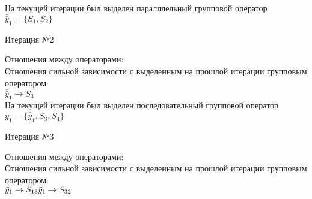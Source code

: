 \documentclass[a4paper,14pt]{article}
\begin{document}
%
На текущей итерации был выделен паралллельный групповой оператор $\bar{\bar{y}}_{1} = \{S_{1}, S_{2}\}$
\\
\begin{center} Итерация №2 \end{center}
Отношения между операторами: \\
Отношения сильной зависимости с выделенным на прошлой итерации групповым оператором: \\ \newline
\begin{math}
    \bar{\bar{y}}_{1} \rightarrow S_{3}
\end{math}\\ \newline
%
На текущей итерации был выделен последовательный групповой оператор $\bar{y}_{1} = \{\bar{\bar{y}}_{1}, S_{3}, S_{4}\}$
\\
\begin{center} Итерация №3 \end{center}
Отношения между операторами: \\
Отношения сильной зависимости с выделенным на прошлой итерации групповым оператором: \\ \newline
\begin{math}
    \bar{y}_{1} \rightarrow S_{13} \\ 
\bar{y}_{1} \rightarrow S_{32}
\end{math} \\ \\ \\ 
%
\end{document}
